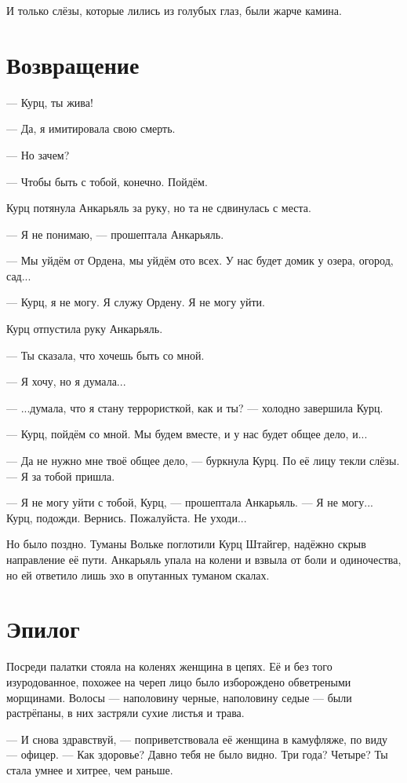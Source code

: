 \documentclass[a4paper,10pt,fleqn]{book}\usepackage{polyglossia}\setdefaultlanguage{english}\setotherlanguage{russian}\defaultfontfeatures{Ligatures=TeX,Mapping=tex-text}\usepackage{xcolor}\definecolor{lightgray}{HTML}{bbbbbb}\color{lightgray}\newcommand{\ml}[3]{\textcolor{black}{#3}}
\begin{document}
И только слёзы, которые лились из голубых глаз, были жарче камина. 

\section{Возвращение}

--- Курц, ты жива!

--- Да, я имитировала свою смерть.

--- Но зачем?

--- Чтобы быть с тобой, конечно.
Пойдём.

Курц потянула Анкарьяль за руку, но та не сдвинулась с места.

--- Я не понимаю, --- прошептала Анкарьяль.

--- Мы уйдём от Ордена, мы уйдём ото всех.
У нас будет домик у озера, огород, сад...

--- Курц, я не могу.
Я служу Ордену.
Я не могу уйти.

Курц отпустила руку Анкарьяль.

--- Ты сказала, что хочешь быть со мной.

--- Я хочу, но я думала...

--- ...думала, что я стану террористкой, как и ты? --- холодно завершила Курц.

--- Курц, пойдём со мной.
Мы будем вместе, и у нас будет общее дело, и...

--- Да не нужно мне твоё общее дело, --- буркнула Курц.
По её лицу текли слёзы.
--- Я за тобой пришла.

--- Я не могу уйти с тобой, Курц, --- прошептала Анкарьяль.
--- Я не могу...
Курц, подожди.
Вернись.
Пожалуйста.
Не уходи...

Но было поздно.
Туманы Вольке поглотили Курц Штайгер, надёжно скрыв направление её пути.
Анкарьяль упала на колени и взвыла от боли и одиночества, но ей ответило лишь эхо в опутанных туманом скалах.

\section{Эпилог}

Посреди палатки стояла на коленях женщина в цепях.
Её и без того изуродованное, похожее на череп лицо было изборождено обветреными морщинами.
Волосы --- наполовину черные, наполовину седые --- были растрёпаны, в них застряли сухие листья и трава.

--- И снова здравствуй, --- поприветствовала её женщина в камуфляже, по виду --- офицер.
--- Как здоровье?
Давно тебя не было видно.
Три года?
Четыре?
Ты стала умнее и хитрее, чем раньше.
\end{document}
